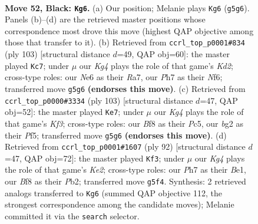 \documentclass[11pt]{article}
\begin{document}
\clearpage

\begin{figure}[p]\centering
\begin{subfigure}{0.46\textwidth}\centering
\resizebox{\linewidth}{!}{%
\newchessgame
\chessboard[
  setfen={3r1b2/7p/p2pn3/P3p1kp/2P1P3/BP3P1R/3K2B1/8 b - - 1 52},
  showmover=false,
  pgfstyle=straightmove, color=movearrow, markmove={g5-g6}
]}
\caption{}
\end{subfigure}\hfill
\begin{subfigure}{0.46\textwidth}\centering
\resizebox{\linewidth}{!}{%
\newchessgame
\chessboard[
  setfen={7R/r2k2p1/3b1n1p/1P1pp3/5p1P/1B3P2/1BP1KP2/8 b - - 0 52},
  showmover=false,
  pgfstyle=straightmove, color=movearrow, markmove={d7-c7}
]}
\caption{}
\end{subfigure}
\\[4pt]
\begin{subfigure}{0.46\textwidth}\centering
\resizebox{\linewidth}{!}{%
\newchessgame
\chessboard[
  setfen={r7/8/3p1k2/p1pP1p2/2P1nB1p/RP5P/4K1P1/8 b - - 9 52},
  showmover=false,
  pgfstyle=straightmove, color=movearrow, markmove={f6-e7}
]}
\caption{}
\end{subfigure}\hfill
\begin{subfigure}{0.46\textwidth}\centering
\resizebox{\linewidth}{!}{%
\newchessgame
\chessboard[
  setfen={8/r7/1p2k3/2ppb3/P3np2/2P4P/1PN1K1P1/R3B3 w - - 4 47},
  showmover=false,
  pgfstyle=straightmove, color=movearrow, markmove={e2-f3}
]}
\caption{}
\end{subfigure}
\caption{\textbf{Move 52, Black: \texttt{Kg6}.} (a) Our position; Melanie plays \texttt{Kg6} (\texttt{g5g6}). Panels (b)--(d) are the retrieved master positions whose correspondence most drove this move (highest QAP objective among those that transfer to it). (b) Retrieved from \texttt{ccrl\_top\_p0001\#834} (ply 103) [structural distance $d$=49, QAP obj=60]: the master played \texttt{Kc7}; under $\mu$ our \emph{Kg4} plays the role of that game's \emph{Kd2}; cross-type roles: our \emph{N}e6 as their \emph{R}a7, our \emph{P}h7 as their \emph{N}f6; transferred move \texttt{g5g6} \textbf{(endorses this move)}. (c) Retrieved from \texttt{ccrl\_top\_p0000\#3334} (ply 103) [structural distance $d$=47, QAP obj=52]: the master played \texttt{Ke7}; under $\mu$ our \emph{Kg4} plays the role of that game's \emph{Kf3}; cross-type roles: our \emph{B}f8 as their \emph{P}c5, our \emph{b}g2 as their \emph{P}f5; transferred move \texttt{g5g6} \textbf{(endorses this move)}. (d) Retrieved from \texttt{ccrl\_top\_p0001\#1607} (ply 92) [structural distance $d$=47, QAP obj=72]: the master played \texttt{Kf3}; under $\mu$ our \emph{Kg4} plays the role of that game's \emph{Ke2}; cross-type roles: our \emph{P}h7 as their \emph{B}e1, our \emph{B}f8 as their \emph{P}b2; transferred move \texttt{g5f4}. Synthesis: 2 retrieved analogs transferred to \texttt{Kg6} (summed QAP objective 112, the strongest correspondence among the candidate moves); Melanie committed it via the \texttt{search} selector.}
\label{fig:thought-m103}
\end{figure}
\end{document}
